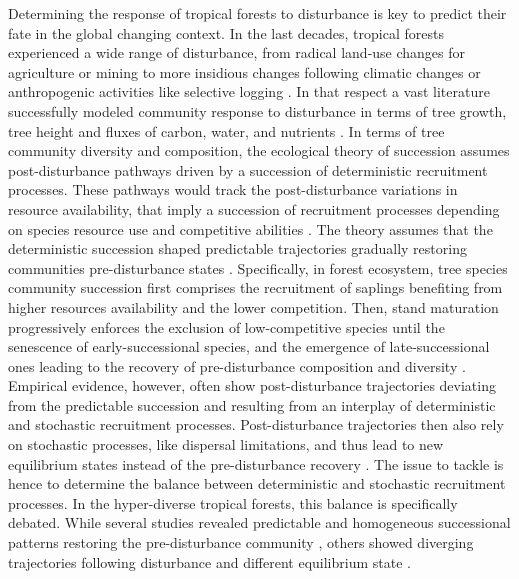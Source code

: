 \documentclass[fleqn,10pt]{ArtEcoFoG} %
\begin{document}
Determining the response of tropical forests to disturbance is key to
predict their fate in the global changing context. In the last decades,
tropical forests experienced a wide range of disturbance, from radical
land-use changes for agriculture or mining
\citep{Dezecache2017a, Dezecache2017b} to more insidious changes
following climatic changes or anthropogenic activities like selective
logging \citep{Baraloto2012a, Aubry-Kientz2015}. In that respect a vast
literature successfully modeled community response to disturbance in
terms of tree growth, tree height and fluxes of carbon, water, and
nutrients
\citep{Gourlet-Fleury2000, Putz2012, Piponiot2016, Rutishauser2016}. In
terms of tree community diversity and composition, the ecological theory
of succession assumes post-disturbance pathways driven by a succession
of deterministic recruitment processes. These pathways would track the
post-disturbance variations in resource availability, that imply a
succession of recruitment processes depending on species resource use
and competitive abilities \citep{Clements1916, Meiners2015}. The theory
assumes that the deterministic succession shaped predictable
trajectories gradually restoring communities pre-disturbance states
\citep{Chesson2000, Rees2001, Adler2007}. Specifically, in forest
ecosystem, tree species community succession first comprises the
recruitment of saplings benefiting from higher resources availability
and the lower competition. Then, stand maturation progressively enforces
the exclusion of low-competitive species until the senescence of
early-successional species, and the emergence of late-successional ones
leading to the recovery of pre-disturbance composition and diversity
\citep{Denslow2000}. Empirical evidence, however, often show
post-disturbance trajectories deviating from the predictable succession
and resulting from an interplay of deterministic and stochastic
recruitment processes. Post-disturbance trajectories then also rely on
stochastic processes, like dispersal limitations, and thus lead to new
equilibrium states instead of the pre-disturbance recovery
\citep{Hubbell2001, Chave2004, Norden2015}. The issue to tackle is hence
to determine the balance between deterministic and stochastic
recruitment processes. In the hyper-diverse tropical forests, this
balance is specifically debated. While several studies revealed
predictable and homogeneous successional patterns restoring the
pre-disturbance community \citep{Norden2009, Letcher2015}, others showed
diverging trajectories following disturbance and different equilibrium
state \citep{Longworth2014, Norden2015}.
\end{document}
